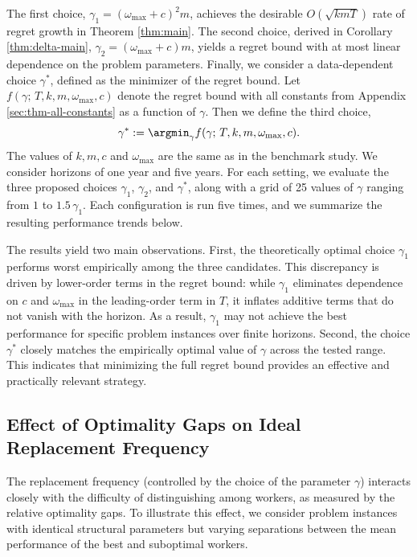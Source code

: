 \documentclass[opre,blindrev]{informs3}
\begin{document}
\begin{APPENDICES}
The first choice, \(\gamma_1 = (\omega_{\max} + c)^2 m\), achieves the desirable \(O(\sqrt{kmT})\) rate of regret growth in Theorem \ref{thm:main}. The second choice, derived in Corollary \ref{thm:delta-main}, \(\gamma_2 = (\omega_{\max} + c) m\), yields a regret bound with at most linear dependence on the problem parameters. Finally, we consider a data-dependent choice \(\gamma^*\), defined as the minimizer of the regret bound. Let \(f(\gamma;\, T,k,m,\omega_{\max},c)\) denote the regret bound with all constants from Appendix \ref{sec:thm-all-constants} as a function of \(\gamma\). Then we define the third choice,
\[
    \gamma^* := \argmin_{\gamma} f(\gamma;\, T,k,m,\omega_{\max},c).
\]
The values of \(k,m,c\) and \(\omega_{\max}\) are the same as in the benchmark study. We consider horizons of one year and five years. For each setting, we evaluate the three proposed choices \(\gamma_1\), \(\gamma_2\), and \(\gamma^*\), along with a grid of 25 values of \(\gamma\) ranging from \(1\) to \(1.5\,\gamma_1\). Each configuration is run five times, and we summarize the resulting performance trends below.

The results yield two main observations. First, the theoretically optimal choice \(\gamma_1\) performs worst empirically among the three candidates. This discrepancy is driven by lower-order terms in the regret bound: while \(\gamma_1\) eliminates dependence on \(c\) and \(\omega_{\max}\) in the leading-order term in \(T\), it inflates additive terms that do not vanish with the horizon. As a result, \(\gamma_1\) may not achieve the best performance for specific problem instances over finite horizons. Second, the choice \(\gamma^*\) closely matches the empirically optimal value of \(\gamma\) across the tested range. This indicates that minimizing the full regret bound provides an effective and practically relevant strategy.

\vspace{-.1in}

\subsection{Effect of Optimality Gaps on Ideal Replacement Frequency}\label{numerical:delta-switch}
The replacement frequency (controlled by the choice of the parameter \(\gamma\)) interacts closely with the difficulty of distinguishing among workers, as measured by the relative optimality gaps. To illustrate this effect, we consider problem instances with identical structural parameters but varying separations between the mean performance of the best and suboptimal workers.


\end{APPENDICES}
\end{document}
